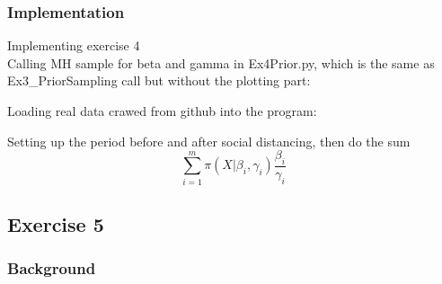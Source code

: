 \documentclass[a4paper]{article}
\begin{document}
    \subsubsection{Implementation}
    Implementing exercise 4
    \\
    Calling MH sample for beta and gamma in Ex4Prior.py, which is the same as Ex3\_PriorSampling call but without the plotting part:
    
    Loading real data crawed from github into the program:
    
    Setting up the period before and after social distancing, then do the sum 
    $$\sum_{i=1}^m \pi (X | \beta_i ,\gamma_i) \frac{\beta_i}{\gamma_i} $$
    
    
    \subsection{Exercise 5}
    \subsubsection{Background}
    
    
    
\end{document}
